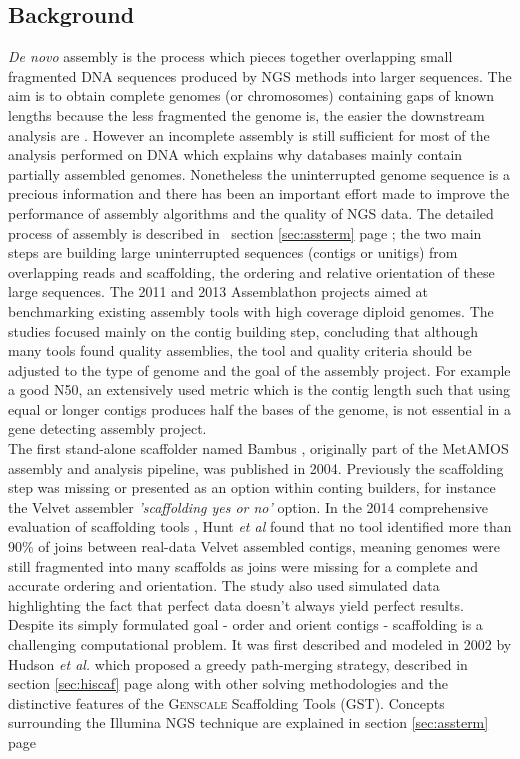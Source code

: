 \documentclass[12pt]{article}
\newcommand*{\fulleref}[1]{section \hyperref[{#1}] {\ref*{#1}} page {\pageref{#1}}}%
\begin{document}
\subsection{Background}
\textit{De novo} assembly is the process which pieces together overlapping small fragmented DNA sequences produced by NGS methods into larger sequences. The aim is to obtain complete genomes (or chromosomes) containing gaps of known lengths because the less fragmented the genome is, the easier the downstream analysis are \cite{hunt_comprehensive_2014}. However an incomplete assembly is still sufficient for most of the analysis performed on DNA which explains why databases mainly contain partially assembled genomes. Nonetheless the uninterrupted genome sequence is a precious information and there has been an important effort made to improve the performance of assembly algorithms and the quality of NGS data. The detailed process of assembly is described in ~\fulleref{sec:assterm}; the two main steps are building large uninterrupted sequences (contigs or unitigs) from overlapping reads and scaffolding, the ordering and relative orientation of these large sequences. The 2011 and 2013 Assemblathon projects \cite{earl_assemblathon_2011} \cite{bradnam_assemblathon_2013} aimed at  benchmarking existing assembly tools with high coverage diploid genomes. The studies focused mainly on the contig building step, concluding that although many tools found quality assemblies, the tool and quality criteria should be adjusted to the type of genome and the goal of the assembly project. For example a good N50, an extensively used metric which is the contig length such that using equal or longer contigs produces half the bases of the genome, is not essential in a gene detecting assembly project. \\
The first stand-alone scaffolder named Bambus \cite{pop_hierarchical_2004}, originally part of the MetAMOS \cite{treangen_metamos:_2013} assembly and analysis pipeline, was published in 2004. Previously the scaffolding step was missing or presented as an option within conting builders, for instance the Velvet\cite{zerbino_velvet:_2008} assembler \textit{'scaffolding yes or no'} option. In the 2014 comprehensive evaluation of scaffolding tools \cite{hunt_comprehensive_2014-1}, Hunt \textit{et al} found that no tool identified more than 90\% of joins between real-data Velvet assembled contigs, meaning genomes were still fragmented into many scaffolds as joins were missing for a complete and accurate ordering and orientation. The study also used simulated data highlighting the fact that perfect data doesn't always yield perfect results. Despite its simply formulated goal - order and orient contigs - scaffolding is a challenging computational problem. It was first described and modeled in 2002 by Hudson \textit{et al.}\cite{huson_greedy_2002} which proposed a greedy path-merging strategy, described in \fulleref{sec:hiscaf} along with other solving methodologies and the distinctive features of the \textsc{Genscale} Scaffolding Tools (GST). Concepts surrounding the Illumina NGS technique are explained in \fulleref{sec:assterm}
\end{document}
